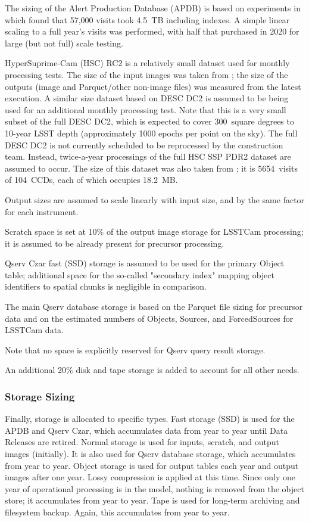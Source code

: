 The sizing of the Alert Production Database (APDB) is based on experiments in \cite{DMTN-113} which found that 57,000 visits took 4.5~TB including indexes.
A simple linear scaling to a full year's visits was performed, with half that purchased in 2020 for large (but not full) scale testing.

HyperSuprime-Cam (HSC) RC2 is a relatively small dataset used for monthly processing tests.
The size of the input images was taken from \cite{DMTN-091}; the size of the outputs (image and Parquet/other non-image files) was measured from the latest execution.
A similar size dataset based on DESC DC2 is assumed to be being used for an additional monthly processing test.
Note that this is a very small subset of the full DESC DC2, which is expected to cover 300~square degrees to 10-year LSST depth (approximately 1000 epochs per point on the sky).
The full DESC DC2 is not currently scheduled to be reprocessed by the construction team.
Instead, twice-a-year processings of the full HSC SSP PDR2 dataset are assumed to occur.
The size of this dataset was also taken from \cite{DMTN-091}; it is 5654~visits of 104~CCDs, each of which occupies 18.2~MB.

Output sizes are assumed to scale linearly with input size, and by the same factor for each instrument.

Scratch space is set at 10\% of the output image storage for LSSTCam processing; it is assumed to be already present for precursor processing.

Qserv Czar fast (SSD) storage is assumed to be used for the primary Object table; additional space for the so-called "secondary index" mapping object identifiers to spatial chunks is negligible in comparison.

The main Qserv database storage is based on the Parquet file sizing for precursor data and on the estimated numbers of Objects, Sources, and ForcedSources for LSSTCam data.

Note that no space is explicitly reserved for Qserv query result storage.

An additional 20\% disk and tape storage is added to account for all other needs.

\subsubsection{Storage Sizing}
Finally, storage is allocated to specific types.
Fast storage (SSD) is used for the APDB and Qserv Czar, which accumulates data from year to year until Data Releases are retired.
Normal storage is used for inputs, scratch, and output images (initially).
It is also used for Qserv database storage, which accumulates from year to year.
Object storage is used for output tables each year and output images after one year.
Lossy compression is applied at this time.
Since only one year of operational processing is in the model, nothing is removed from the object store; it accumulates from year to year.
Tape is used for long-term archiving and filesystem backup.
Again, this accumulates from year to year.

